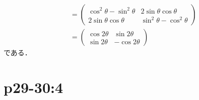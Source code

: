 \documentclass[a4paper,10pt,fleqn]{ltjsarticle}
\begin{document}
\begin{tleftbar}
\begin{align*}
                                   & = \begin{pmatrix} \cos ^2 \theta - \sin ^2 \theta & 2\sin \theta \cos \theta \\ 2\sin \theta \cos \theta & \sin ^2 \theta -\cos ^2 \theta \end{pmatrix} \\
                                   & = \begin{pmatrix} \cos 2 \theta & \sin 2 \theta \\ \sin 2\theta & -\cos 2 \theta \end{pmatrix}
    \end{align*}
    である．
\end{tleftbar}


\section*{p29-30:4}
\end{document}
